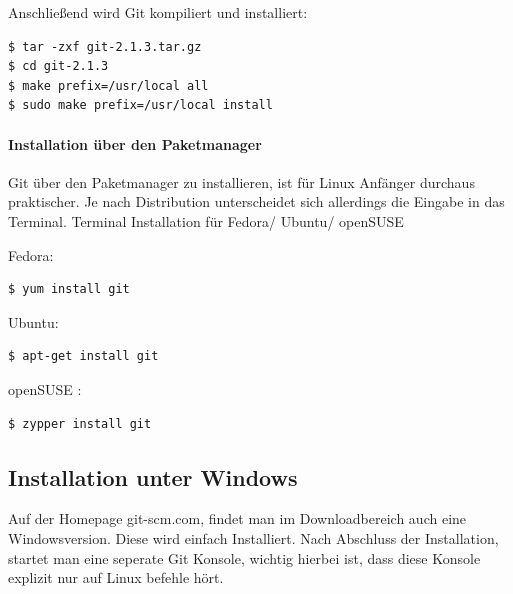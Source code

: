 \documentclass[12pt,a4paper,bibliography=totocnumbered,listof=totocnumbered]{scrartcl}
\begin{document}
Anschließend wird Git kompiliert und installiert:
\begin{lstlisting}
$ tar -zxf git-2.1.3.tar.gz
$ cd git-2.1.3
$ make prefix=/usr/local all
$ sudo make prefix=/usr/local install
 \end{lstlisting}

\paragraph{Installation über den Paketmanager}

Git über den Paketmanager zu installieren, ist für Linux Anfänger durchaus praktischer. Je nach Distribution unterscheidet sich allerdings die Eingabe in das Terminal.
\newpage
Terminal Installation für Fedora/ Ubuntu/ openSUSE 

Fedora:
\begin{lstlisting}
$ yum install git
 \end{lstlisting}

Ubuntu:
\begin{lstlisting}
$ apt-get install git
 \end{lstlisting}

openSUSE :
\begin{lstlisting}
$ zypper install git
 \end{lstlisting}



\subsection{Installation unter Windows}
Auf der Homepage git-scm.com, findet man im Downloadbereich auch eine Windowsversion.
Diese wird einfach Installiert. Nach Abschluss der Installation, startet man eine seperate Git Konsole, wichtig hierbei ist, dass diese Konsole explizit nur auf Linux befehle hört. 
\end{document}
